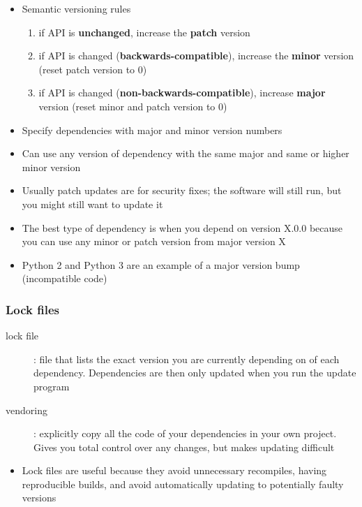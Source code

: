 \documentclass[letterpaper,12pt]{article}
\begin{document}
\begin{itemize}
 \item Semantic versioning rules
       \begin{enumerate}
        \item if API is \textbf{unchanged}, increase the \textbf{patch} version
        \item if API is changed (\textbf{backwards-compatible}), increase the \textbf{minor} version (reset patch version to 0)
        \item if API is changed (\textbf{non-backwards-compatible}), increase \textbf{major} version (reset minor and patch version to 0)
       \end{enumerate}
 \item Specify dependencies with major and minor version numbers
 \item Can use any version of dependency with the same major and same or higher minor version
 \item Usually patch updates are for security fixes; the software will still run, but you might still want to update it
 \item The best type of dependency is when you depend on version X.0.0 because you can use any minor or patch version from major version X
 \item Python 2 and Python 3 are an example of a major version bump (incompatible code)
\end{itemize}

\subsubsection{Lock files}

\begin{description}
 \item[lock file]: file that lists the exact version you are currently depending on of each dependency. Dependencies are then only updated when you run the update program
 \item[vendoring]: explicitly copy all the code of your dependencies in your own project. Gives you total control over any changes, but makes updating difficult
\end{description}

\begin{itemize}
 \item Lock files are useful because they avoid unnecessary recompiles, having reproducible builds, and avoid automatically updating to potentially faulty versions
\end{itemize}
\end{document}
